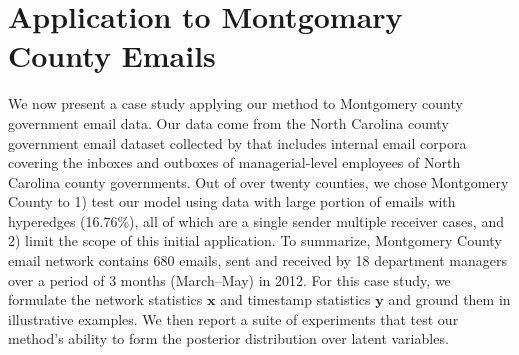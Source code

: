 \documentclass[ba]{imsart}
\numberwithin{equation}{section}
\theoremstyle{plain}
\begin{document}
 	   \section{Application to Montgomary County Emails}\label{subsec:Emails}
 	   We now present a case study applying our method to Montgomery county government email data.
 	   Our data come from the North Carolina county government email dataset collected by \cite{ben2017transparency} that includes internal email corpora covering the inboxes and outboxes of managerial-level employees of North Carolina county governments. Out of over twenty counties, we chose Montgomery County to 1) test our model using data with large portion of emails with hyperedges (16.76\%), all of which are a single sender multiple receiver cases, and 2) limit the scope of this initial application. To summarize, Montgomery County email network contains 680 emails, sent and received by 18 department managers over a period of 3 months (March--May) in 2012.  For this case study,
 	   we formulate the network statistics $\boldsymbol{x}$ and timestamp statistics $\boldsymbol{y}$ and ground them in illustrative examples. We then report a suite of experiments that test our method’s ability to form the posterior distribution over latent variables. 
\end{document}
